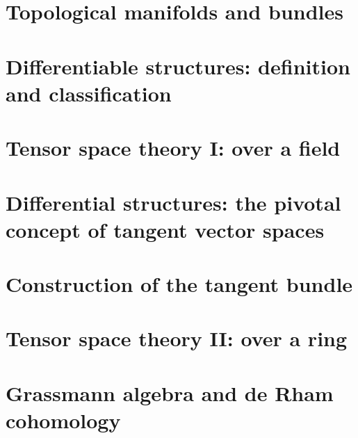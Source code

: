 \documentclass[a4paper,11pt]{article}
\theoremstyle{definition} %
\theoremstyle{plain} %
\theoremstyle{remark} %
\begin{document}
\section{Topological manifolds and bundles}

\newpage

\section{Differentiable structures: definition and classification}

\newpage

\section{Tensor space theory I: over a field}

\newpage

 \section{Differential structures: the pivotal concept of tangent vector spaces}
 
 \newpage

\section{Construction of the tangent bundle}

\newpage

\section{Tensor space theory II: over a ring}

\newpage

\section{Grassmann algebra and de Rham cohomology}

\newpage




\end{document}
